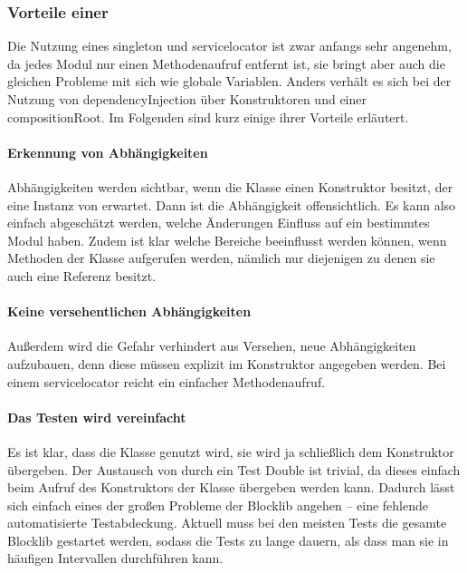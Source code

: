 \subsubsection{Vorteile einer }

Die Nutzung eines \gls{singleton} und \gls{servicelocator} ist zwar anfangs sehr angenehm, da jedes Modul nur einen Methodenaufruf entfernt ist, sie bringt aber auch die gleichen Probleme mit sich wie globale Variablen. Anders verhält es sich bei der Nutzung von \gls{dependencyInjection} über Konstruktoren und einer \gls{compositionRoot}. Im Folgenden sind kurz einige ihrer Vorteile erläutert.

\paragraph{Erkennung von Abhängigkeiten}Abhängigkeiten werden sichtbar, wenn die Klasse einen Konstruktor besitzt, der eine Instanz von  erwartet. Dann ist die Abhängigkeit offensichtlich. Es kann also einfach abgeschätzt werden, welche Änderungen Einfluss auf ein bestimmtes Modul haben. Zudem ist klar welche Bereiche beeinflusst werden können, wenn Methoden der Klasse aufgerufen werden, nämlich nur diejenigen zu denen sie auch eine Referenz besitzt.

\paragraph{Keine versehentlichen Abhängigkeiten} Außerdem wird die Gefahr verhindert aus Versehen, neue Abhängigkeiten aufzubauen, denn diese müssen explizit im Konstruktor angegeben werden. Bei einem \gls{servicelocator} reicht ein einfacher Methodenaufruf.

\paragraph{Das Testen wird vereinfacht} Es ist klar, dass die Klasse  genutzt wird, sie wird ja schließlich dem Konstruktor übergeben. Der Austausch von  durch ein Test Double ist trivial, da dieses einfach beim Aufruf des Konstruktors der Klasse übergeben werden kann. Dadurch lässt sich einfach eines der großen Probleme der Blocklib angehen -- eine fehlende automatisierte Testabdeckung. Aktuell muss bei den meisten Tests die gesamte Blocklib gestartet werden, sodass die Tests zu lange dauern, als dass man sie in häufigen Intervallen durchführen kann.

